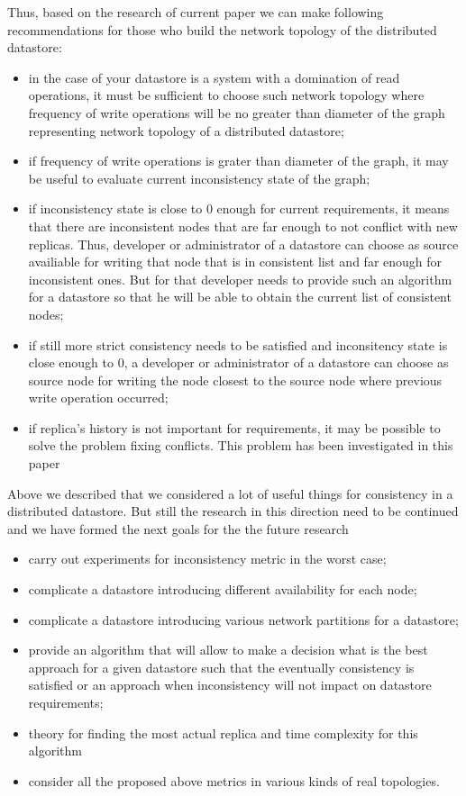 \documentclass{llncs}
\begin{document}
Thus, based on the research of current paper we can make following recommendations for those who build the network topology of the distributed datastore:
\begin{itemize}
\item in the case of your datastore is a system with a domination of read operations, it must be sufficient to choose such network topology where frequency of write operations will be no greater than diameter of the graph representing network topology of a distributed datastore;
\item if frequency of write operations is grater than diameter of the graph, it may be useful to evaluate current inconsistency state of the graph;
\item if inconsistency state is close to 0 enough for current requirements, it means that there are inconsistent nodes that are far enough to not conflict with new replicas. Thus, developer or administrator of a datastore  can choose as source availiable for writing that node that is in consistent list and far enough for inconsistent ones. But for that developer needs to provide such an algorithm for a datastore so that he will be able to obtain the current list of consistent nodes;
\item if still more strict consistency needs to be satisfied and inconsitency state is close enough to 0, a developer or administrator of a datastore can choose as source node for writing the node closest to the source node where previous write operation occurred;
\item if replica's history is not important for requirements, it may be possible to solve the problem fixing conflicts. This problem has been investigated in this paper \cite{bib:c_ts}
\end{itemize}
Above we described that we considered a lot of useful things for consistency in a distributed datastore. But still the research in this direction need to be continued and we have formed the next goals for the the future research
\begin{itemize}
\item carry out experiments for inconsistency metric in the worst case;
\item complicate a datastore introducing different availability for each node;
\item complicate a datastore introducing various network partitions for a datastore;
\item provide an algorithm that will allow to make a decision what is the best approach for a given datastore such that the eventually consistency is satisfied or an approach when inconsistency will not impact on datastore requirements;
\item theory for finding the most actual replica and time complexity for this algorithm
\item consider all the proposed above metrics in various kinds of real topologies.
\end{itemize}
\end{document}
